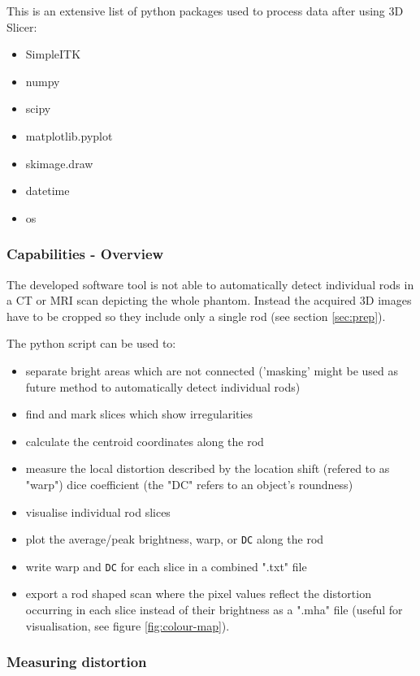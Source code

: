 This is an extensive list of python packages used to process data after using 3D Slicer:
\begin{itemize}
 \item SimpleITK
 \item numpy
 \item scipy
 \item matplotlib.pyplot \cite{Hunter2007}
 \item skimage.draw
 \item datetime
 \item os
\end{itemize}


\subsubsection{Capabilities - Overview}

The developed software tool is not able to automatically detect individual rods in a CT or MRI scan depicting the whole phantom.
Instead the acquired 3D images have to be cropped so they include only a single rod (see section \ref{sec:prep}).

The python script can be used to:
\begin{itemize}
 \item separate bright areas which are not connected ('masking' might be used as future method to automatically detect individual rods)
 \item find and mark slices which show irregularities
 \item calculate the centroid coordinates along the rod
 \item measure the local distortion described by the
  \subitem location shift (refered to as "warp")
  \subitem dice coefficient (the "DC" refers to an object's roundness)
 \item visualise individual rod slices
 \item plot the average/peak brightness, warp, or \texttt{DC} along the rod
 \item write warp and \texttt{DC}  for each slice in a combined ".txt" file
 \item export a rod shaped scan where the pixel values reflect the distortion occurring in each slice instead of their brightness as a ".mha" file (useful for visualisation, see figure \ref{fig:colour-map}).
\end{itemize}


\subsubsection{Measuring distortion}

